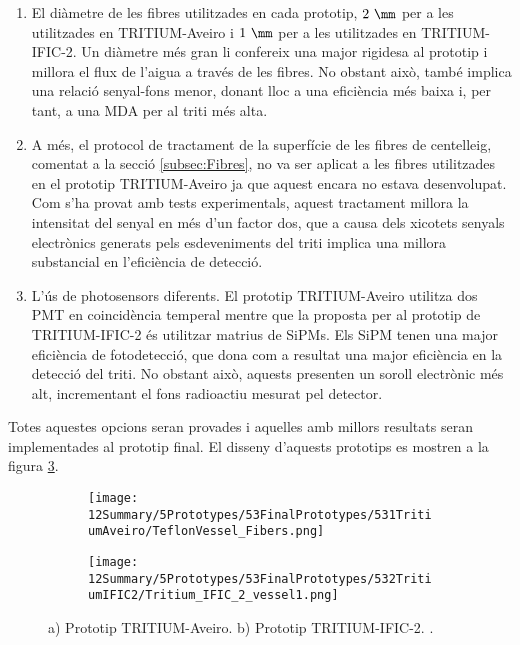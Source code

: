 \begin{enumerate}

\item{} El diàmetre de les fibres utilitzades en cada prototip, $2~\mm$ per a les utilitzades en TRITIUM-Aveiro i $1~\mm$ per a les utilitzades en TRITIUM-IFIC-2. Un diàmetre més gran li confereix una major rigidesa al prototip i millora el flux de l'aigua a través de les fibres. No obstant això, també implica una relació senyal-fons menor, donant lloc a una eficiència més baixa i, per tant, a una MDA per al triti més alta.

\item{} A més, el protocol de tractament de la superfície de les fibres de centelleig, comentat a la secció \ref{subsec:Fibres}, no va ser aplicat a les fibres utilitzades en el prototip TRITIUM-Aveiro ja que aquest encara no estava desenvolupat. Com s'ha provat amb tests experimentals, aquest tractament millora la intensitat del senyal en més d'un factor dos, que a causa dels xicotets senyals electrònics generats pels esdeveniments del triti implica una millora substancial en l'eficiència de detecció.


\item{} L'ús de photosensors diferents. El prototip TRITIUM-Aveiro utilitza dos PMT en coincidència temperal mentre que la proposta per al prototip de TRITIUM-IFIC-2 és utilitzar matrius de SiPMs. Els SiPM tenen una major eficiència de fotodetecció, que dona com a resultat una major eficiència en la detecció del triti. No obstant això, aquests presenten un soroll electrònic més alt, incrementant el fons radioactiu mesurat pel detector. %

\end{enumerate} 

Totes aquestes opcions seran provades i aquelles amb millors resultats seran implementades al prototip final. El disseny d'aquests prototips es mostren a la figura \ref{fig:PrototipsAveiroIFIC2}.

\begin{figure}
\centering
    \begin{subfigure}[b]{0.5\textwidth}
    \centering
    \texttt{[image: 12Summary/5Prototypes/53FinalPrototypes/531TritiumAveiro/TeflonVessel\_Fibers.png]}  
        \caption{}\label{subfig:PrototipAveiro}
    \end{subfigure}
    \hfill
    \begin{subfigure}[b]{0.5\textwidth}
    \centering
    \texttt{[image: 12Summary/5Prototypes/53FinalPrototypes/532TritiumIFIC2/Tritium\_IFIC\_2\_vessel1.png]}  
    \caption{\label{subfig:PrototipIFIC2}}
    \end{subfigure}
\caption{a) Prototip TRITIUM-Aveiro. b) Prototip TRITIUM-IFIC-2. \label{fig:PrototipsAveiroIFIC2}.}
\end{figure}

